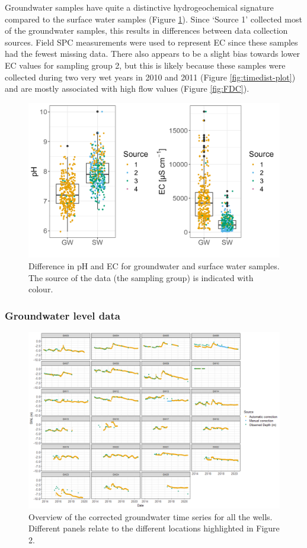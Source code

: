 \documentclass[, manuscript]{copernicus}
\begin{document}
Groundwater samples have quite a distinctive hydrogeochemical signature
compared to the surface water samples (Figure \ref{fig:gw_sw-plot}).
Since `Source 1' collected most of the groundwater samples, this results
in differences between data collection sources. Field SPC measurements
were used to represent EC since these samples had the fewest missing
data. There also appears to be a slight bias towards lower EC values for
sampling group 2, but this is likely because these samples were
collected during two very wet years in 2010 and 2011 (Figure
\ref{fig:timedist-plot}) and are mostly associated with high flow values
(Figure \ref{fig:FDC}).

\begin{figure}
\includegraphics[width=0.8\linewidth]{Figures/gwsw} \caption{Difference in pH and EC for groundwater and surface water samples. The source of the data (the sampling group) is indicated with colour.}\label{fig:gw_sw-plot}
\end{figure}

\subsubsection{Groundwater level data}

\begin{figure}
\includegraphics[width=1\linewidth]{Figures/Final_Corrected_piezodepths} \caption{Overview of the corrected groundwater time series for all the wells. Different panels relate to the different locations highlighted in Figure 2.}\label{fig:gw-series}
\end{figure}
\end{document}
